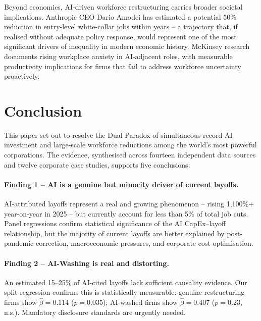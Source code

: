 \documentclass[12pt, a4paper]{article}
\begin{document}
Beyond economics, AI-driven workforce restructuring carries broader societal implications.
Anthropic CEO Dario Amodei \citeyearpar{anthropic2026} has estimated a potential 50\%
reduction in entry-level white-collar jobs within years -- a trajectory that, if realised
without adequate policy response, would represent one of the most significant drivers of
inequality in modern economic history. McKinsey research \citeyearpar{mckinsey2025} documents
rising workplace anxiety in AI-adjacent roles, with measurable productivity implications for
firms that fail to address workforce uncertainty proactively.

\section{Conclusion}

This paper set out to resolve the Dual Paradox of simultaneous record AI investment and
large-scale workforce reductions among the world's most powerful corporations. The evidence,
synthesised across fourteen independent data sources and twelve corporate case studies,
supports five conclusions:

\paragraph{Finding 1 -- AI is a genuine but minority driver of current layoffs.}
AI-attributed layoffs represent a real and growing phenomenon -- rising 1,100\%+ year-on-year
in 2025 -- but currently account for less than 5\% of total job cuts. Panel regressions confirm
statistical significance of the AI CapEx--layoff relationship, but the majority of current
layoffs are better explained by post-pandemic correction, macroeconomic pressures, and corporate
cost optimisation.

\paragraph{Finding 2 -- AI-Washing is real and distorting.}
An estimated 15--25\% of AI-cited layoffs lack sufficient causality evidence. Our split
regression confirms this is statistically measurable: genuine restructuring firms show
$\hat{\beta} = 0.114$ ($p = 0.035$); AI-washed firms show $\hat{\beta} = 0.407$ ($p = 0.23$,
n.s.). Mandatory disclosure standards are urgently needed.
\end{document}
